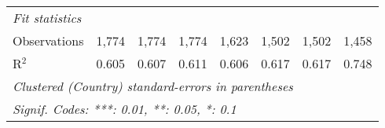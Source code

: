 \begin{tabular}{lccccccc}
   \midrule \emph{Fit statistics}\\
   Observations                                                        & 1,774   & 1,774        & 1,774          & 1,623          & 1,502          & 1,502          & 1,458\\  
   R$^2$                                                               & 0.605   & 0.607        & 0.611          & 0.606          & 0.617          & 0.617          & 0.748\\  
   \midrule
   \multicolumn{8}{l}{\emph{Clustered (Country) standard-errors in parentheses}}\\
   \multicolumn{8}{l}{\emph{Signif. Codes: ***: 0.01, **: 0.05, *: 0.1}}\\
\end{tabular}
\par\endgroup


